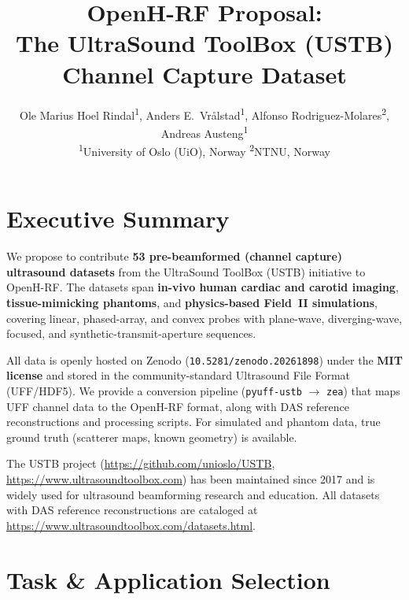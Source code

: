 \documentclass[11pt,a4paper]{article}
\title{\textbf{OpenH-RF Proposal:}\\[4pt]
The UltraSound ToolBox (USTB) Channel Capture Dataset}
\author{
  Ole Marius Hoel Rindal\textsuperscript{1},
  Anders E.\ Vr\aa lstad\textsuperscript{1},
  Alfonso Rodriguez-Molares\textsuperscript{2},\\
  Andreas Austeng\textsuperscript{1}
  \\[6pt]
  \textsuperscript{1}University of Oslo (UiO), Norway \quad
  \textsuperscript{2}NTNU, Norway
}
\date{}
\begin{document}
\maketitle
\thispagestyle{empty}

\section{Executive Summary}

We propose to contribute \textbf{53 pre-beamformed (channel capture) ultrasound datasets} from the UltraSound ToolBox (USTB) initiative to OpenH-RF.
The datasets span \textbf{in-vivo human cardiac and carotid imaging}, \textbf{tissue-mimicking phantoms}, and \textbf{physics-based Field~II simulations}, covering linear, phased-array, and convex probes with plane-wave, diverging-wave, focused, and synthetic-transmit-aperture sequences.

All data is openly hosted on Zenodo (\texttt{10.5281/zenodo.20261898}) under the \textbf{MIT license} and stored in the community-standard Ultrasound File Format (UFF/HDF5).
We provide a conversion pipeline (\texttt{pyuff-ustb} $\rightarrow$ \texttt{zea}) that maps UFF channel data to the OpenH-RF format, along with DAS reference reconstructions and processing scripts.
For simulated and phantom data, true ground truth (scatterer maps, known geometry) is available.

The USTB project (\url{https://github.com/unioslo/USTB}, \url{https://www.ultrasoundtoolbox.com}) has been maintained since 2017 and is widely used for ultrasound beamforming research and education.
All datasets with DAS reference reconstructions are cataloged at \url{https://www.ultrasoundtoolbox.com/datasets.html}.

\section{Task \& Application Selection}
\end{document}

